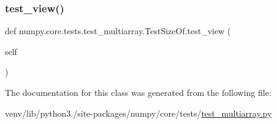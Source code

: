 \subsubsection{\texorpdfstring{test\+\_\+view()}{test\_view()}}
{\footnotesize\ttfamily def numpy.\+core.\+tests.\+test\+\_\+multiarray.\+Test\+Size\+Of.\+test\+\_\+view (\begin{DoxyParamCaption}\item[{}]{self }\end{DoxyParamCaption})}



The documentation for this class was generated from the following file\+:\begin{DoxyCompactItemize}
\item 
venv/lib/python3./site-\/packages/numpy/core/tests/\hyperlink{core_2tests_2test__multiarray_8py}{test\+\_\+multiarray.\+py}\end{DoxyCompactItemize}

